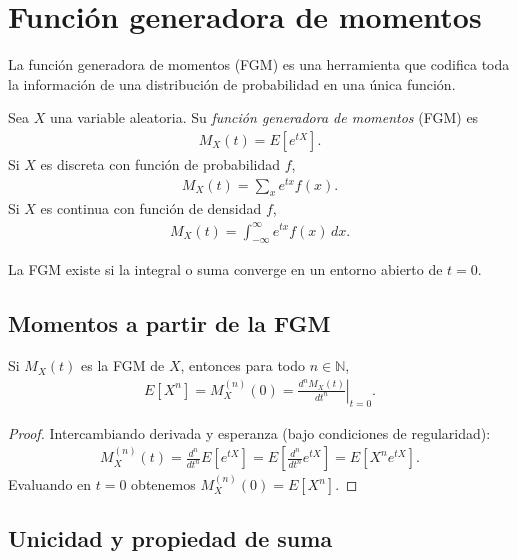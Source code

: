 \section{Función generadora de momentos}
\label{sec:mgf}\label{sec:3.4}

La función generadora de momentos (FGM) es una herramienta que codifica toda la
información de una distribución de probabilidad en una única función.

\begin{definicion}
Sea $X$ una variable aleatoria. Su \emph{función generadora de momentos} (FGM) es
\begin{align}
 \label{eq:2.8.11}
 M_X(t) = E\!\left[e^{tX}\right].
\end{align}
Si $X$ es discreta con función de probabilidad $f$,
\begin{align}
 M_X(t) = \sum_x e^{tx} f(x).
\end{align}
Si $X$ es continua con función de densidad $f$,
\begin{align}
 M_X(t) = \int_{-\infty}^{\infty} e^{tx} f(x)\,dx.
\end{align}
\end{definicion}

La FGM existe si la integral o suma converge en un entorno abierto de $t=0$.

\subsection{Momentos a partir de la FGM}

\begin{teorema}
Si $M_X(t)$ es la FGM de $X$, entonces para todo $n \in \mathbb{N}$,
\begin{align}
 \label{eq:2.8.12}
 E\!\left[X^n\right] = M_X^{(n)}(0) = \left.\frac{d^n M_X(t)}{dt^n}\right|_{t=0}.
\end{align}
\end{teorema}

\begin{proof}
Intercambiando derivada y esperanza (bajo condiciones de regularidad):
\begin{align}
 M_X^{(n)}(t) = \frac{d^n}{dt^n}E[e^{tX}] = E\!\left[\frac{d^n}{dt^n}e^{tX}\right]
 = E\!\left[X^n e^{tX}\right].
\end{align}
Evaluando en $t=0$ obtenemos $M_X^{(n)}(0) = E[X^n]$.
\end{proof}

\subsection{Unicidad y propiedad de suma}

